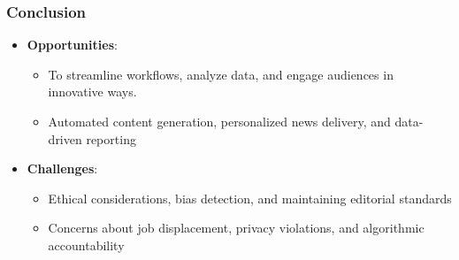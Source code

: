 \begin{frame}[fragile]\frametitle{Conclusion}

\begin{itemize}
\item \textbf{Opportunities}: 
    \begin{itemize}
        \item To streamline workflows, analyze data, and engage audiences in innovative ways.
        \item Automated content generation, personalized news delivery, and data-driven reporting 
    \end{itemize}
\item \textbf{Challenges}: 
    \begin{itemize}
        \item Ethical considerations, bias detection, and maintaining editorial standards
        \item Concerns about job displacement, privacy violations, and algorithmic accountability
    \end{itemize}
\end{itemize}

\end{frame}